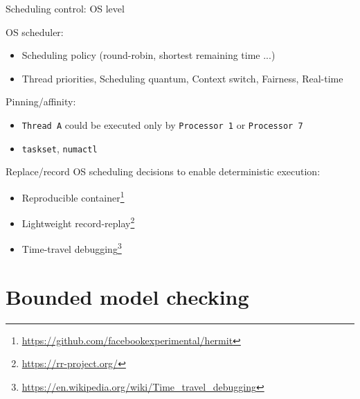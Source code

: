 \begin{frame}[t,noframenumbering]{Scheduling control: OS level}

OS scheduler:
\begin{itemize}
  \item Scheduling policy (round-robin, shortest remaining time ...)
  \item Thread priorities, Scheduling quantum, Context switch, Fairness, Real-time
\end{itemize}

Pinning/affinity:
\begin{itemize}
  \item \texttt{Thread A} could be executed only by \texttt{Processor 1} or \texttt{Processor 7}
  \item \texttt{taskset}, \texttt{numactl}
\end{itemize}

\pause

Replace/record OS scheduling decisions to enable deterministic execution:
\begin{itemize}
  \item Reproducible container\footnote<2->{\tiny\url{https://github.com/facebookexperimental/hermit}}
  \item Lightweight record-replay\footnote<2->{\tiny\url{https://rr-project.org/}}
  \item Time-travel debugging\footnote<2->{\tiny\url{https://en.wikipedia.org/wiki/Time_travel_debugging}}
\end{itemize}

\end{frame}


\section{Bounded model checking}
\showTOC



